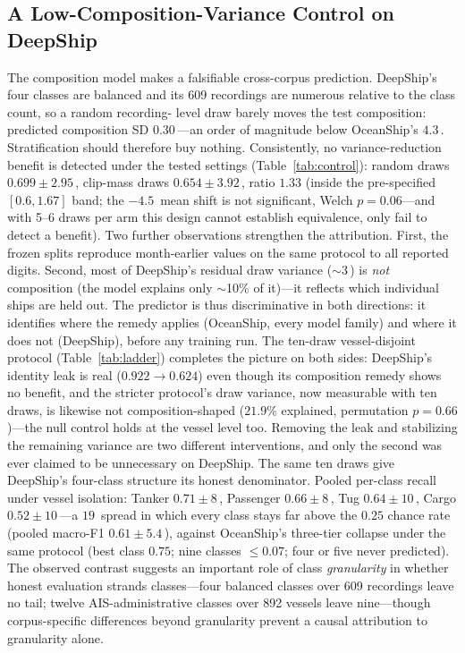 ﻿\documentclass[journal]{IEEEtran}
\newcommand{\pp}{\,\text{pp}}
\begin{document}
\subsection{A Low-Composition-Variance Control on DeepShip}
\label{sec:control}
The composition model makes a falsifiable cross-corpus prediction. DeepShip's four classes are
balanced and its 609 recordings are numerous relative to the class count, so a random recording-
level draw barely moves the test composition: predicted composition SD $0.30$\pp---an order of
magnitude below OceanShip's $4.3$\pp. Stratification should therefore buy nothing. Consistently,
no variance-reduction benefit is detected under the tested settings
(Table~\ref{tab:control}): random draws $0.699\pm2.95$\pp, clip-mass draws $0.654\pm3.92$\pp, ratio
$1.33$ (inside the pre-specified $[0.6,1.67]$ band; the $-4.5$\pp{} mean shift is not significant,
Welch $p=0.06$---and with 5--6 draws per arm this design cannot establish equivalence, only fail
to detect a benefit). Two further observations strengthen the attribution. First, the frozen splits
reproduce month-earlier values on the same protocol to all reported digits. Second, most of DeepShip's residual draw variance
($\sim$3\pp) is \emph{not} composition (the model explains only $\sim$10\% of it)---it reflects
which individual ships are held out. The predictor is thus discriminative in both directions: it
identifies where the remedy applies (OceanShip, every model family) and where it does not
(DeepShip), before any training run. The ten-draw vessel-disjoint protocol
(Table~\ref{tab:ladder}) completes the picture on both sides: DeepShip's identity leak is real
($0.922 \to 0.624$) even though its composition remedy shows no benefit, and the stricter protocol's
draw variance, now measurable with ten draws, is likewise not composition-shaped ($21.9\%$
explained, permutation $p=0.66$)---the null control holds at the vessel level too. Removing the
leak and stabilizing the remaining variance are two different interventions, and only the second
was ever claimed to be unnecessary on DeepShip. The same ten draws give DeepShip's four-class
structure its honest denominator. Pooled per-class recall under vessel isolation: Tanker
$0.71\pm8$\pp, Passenger $0.66\pm8$\pp, Tug $0.64\pm10$\pp, Cargo $0.52\pm10$\pp---a
$19$\pp{} spread in which every class stays far above the $0.25$ chance rate (pooled macro-F1
$0.61\pm5.4$\pp), against OceanShip's
three-tier collapse under the same protocol (best class $0.75$; nine classes $\le0.07$; four or
five never predicted). The observed contrast suggests an important role of class
\emph{granularity} in whether honest evaluation strands classes---four balanced classes over 609
recordings leave no tail; twelve AIS-administrative classes over 892 vessels leave nine---though
corpus-specific differences beyond granularity prevent a causal attribution to granularity alone.
\end{document}
